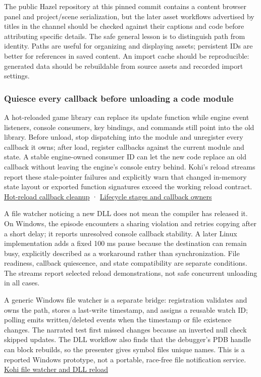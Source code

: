 The public Hazel repository at this pinned commit contains a content browser panel and project/scene serialization, but the later asset workflows advertised by titles in the channel should be checked against their captions and code before attributing specific details. The safe general lesson is to distinguish path from identity. Paths are useful for organizing and displaying assets; persistent IDs are better for references in saved content. An import cache should be reproducible: generated data should be rebuildable from source assets and recorded import settings.

\subsubsection{Quiesce every callback before unloading a code module}\label{06-engine-ii-ch027-quiesce-every-callback-before-unloading-a-code-module}

A hot-reloaded game library can replace its update function while engine event listeners, console consumers, key bindings, and commands still point into the old library. Before unload, stop dispatching into the module and unregister every callback it owns; after load, register callbacks against the current module and state. A stable engine-owned consumer ID can let the new code replace an old callback without leaving the engine's console entry behind. Kohi's reload streams report these stale-pointer failures and explicitly warn that changed in-memory state layout or exported function signatures exceed the working reload contract. \href{https://www.youtube.com/watch?v=U1C9mMrpyF4}{Hot-reload callback cleanup} · \href{https://www.youtube.com/watch?v=W-y6qSUOTw0}{Lifecycle stages and callback owners}

A file watcher noticing a new DLL does not mean the compiler has released it. On Windows, the episode encounters a sharing violation and retries copying after a short delay; it reports unresolved console callback stability. A later Linux implementation adds a fixed 100 ms pause because the destination can remain busy, explicitly described as a workaround rather than synchronization. File readiness, callback quiescence, and state compatibility are separate conditions. The streams report selected reload demonstrations, not safe concurrent unloading in all cases.

A generic Windows file watcher is a separate bridge: registration validates and owns the path, stores a last-write timestamp, and assigns a reusable watch ID; polling emits written/deleted events when the timestamp or file existence changes. The narrated test first missed changes because an inverted null check skipped updates. The DLL workflow also finds that the debugger's PDB handle can block rebuilds, so the presenter gives symbol files unique names. This is a reported Windows prototype, not a portable, race-free file notification service. \href{https://www.youtube.com/watch?v=SBG-qrT8wmg}{Kohi file watcher and DLL reload}

